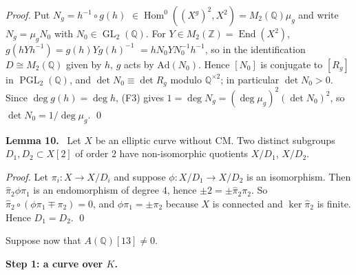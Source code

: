 \documentclass[11pt]{article}
\newenvironment{statement}[1]{\par\medskip\noindent\phantomsection\textbf{#1}\ }{\par\medskip}
\newcommand{\Q}{\mathbb Q}
\newcommand{\Z}{\mathbb Z}
\DeclareMathOperator{\End}{End}
\DeclareMathOperator{\GL}{GL}
\DeclareMathOperator{\PGL}{PGL}
\DeclareMathOperator{\Hom}{Hom}
\begin{document}
\emph{Proof.} Put \(N_g=h^{-1}\circ g(h)\) \(\in\Hom^0((X^g)^2,X^2)=M_2(\Q)\mu_g\) and write \(N_g=\mu_gN_0\)
      with \(N_0\in\GL_2(\Q)\). For \(Y\in M_2(\Z)=\End(X^2)\), \(g(hYh^{-1})=g(h)Yg(h)^{-1}\) \({}=hN_0YN_0^{-1}h^{-1}\),
      so in the identification \(D\cong M_2(\Q)\) given by \(h\), \(g\) acts by \(\mathrm{Ad}(N_0)\). Hence
      \([N_0]\) is conjugate to \([R_g]\) in \(\PGL_2(\Q)\), and \(\det N_0\equiv\det R_g\) modulo
      \(\Q^{\times2}\); in particular \(\det N_0>0\). Since \(\deg g(h)=\deg h\), (F3) gives
      \(1=\deg N_g=(\deg\mu_g)^2(\det N_0)^2\), so \(\det N_0=1/\deg\mu_g\). \qed

\begin{statement}{Lemma 10.}\label{lemma-two-subgroup}
Let \(X\) be an elliptic curve without CM. Two distinct subgroups \(D_1,D_2\subset X[2]\) of order
          \(2\) have non-isomorphic quotients \(X/D_1\), \(X/D_2\).
\end{statement}

\emph{Proof.} Let \(\pi_i:X\to X/D_i\) and suppose \(\phi:X/D_1\to X/D_2\) is an isomorphism. Then
      \(\hat\pi_2\phi\pi_1\) is an endomorphism of degree \(4\), hence \(\pm2=\pm\hat\pi_2\pi_2\). So
      \(\hat\pi_2\circ(\phi\pi_1\mp\pi_2)=0\), and \(\phi\pi_1=\pm\pi_2\) because \(X\) is connected and
      \(\ker\hat\pi_2\) is finite. Hence \(D_1=D_2\). \qed

Suppose now that \(A(\Q)[13]\neq0\).

\textbf{Step 1: a curve over \(K\).}
\end{document}
